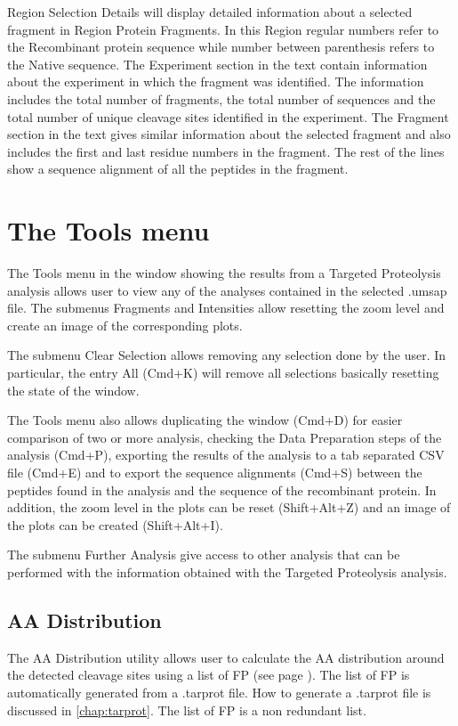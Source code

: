 Region Selection Details will display detailed information about a selected fragment
in Region Protein Fragments. In this Region regular numbers refer to the Recombinant
protein sequence while number between parenthesis refers to the Native sequence.
The Experiment section in the text contain information about the experiment in which
the fragment was identified. The information includes the total number of fragments,
the total number of sequences and the total number of unique cleavage sites identified
in the experiment. The Fragment section in the text gives similar information about
the selected fragment and also includes the first and last residue numbers in the
fragment. The rest of the lines show a sequence alignment of all the peptides in
the fragment.

\section{The Tools menu}

The Tools menu in the window showing the results from a Targeted Proteolysis analysis
allows user to view any of the analyses contained in the selected .umsap file. The
submenus Fragments and Intensities allow resetting the zoom level and create an image
of the corresponding plots.

The submenu Clear Selection allows removing any selection done by the user. In
particular, the entry All (Cmd+K) will remove all selections basically resetting
the state of the window.

The Tools menu also allows duplicating the window (Cmd+D) for easier comparison of
two or more analysis, checking the Data Preparation steps of the analysis (Cmd+P),
exporting the results of the analysis to a tab separated CSV file (Cmd+E) and to
export the sequence alignments (Cmd+S) between the peptides found in the analysis
and the sequence of the recombinant protein. In addition, the zoom level in the plots
can be reset (Shift+Alt+Z) and an image of the plots can be created (Shift+Alt+I).

The submenu Further Analysis give access to other analysis that can be performed
with the information obtained with the Targeted Proteolysis analysis.

\subsection{AA Distribution}
\label{subsec:utilAadistCalc}
The AA Distribution utility allows user to calculate the AA distribution around the detected cleavage sites using a list of FP (see page \pageref{par:tarprotPIP}). The list of FP is automatically generated from a .tarprot file. How to generate a .tarprot file is discussed in \autoref{chap:tarprot}. The list of FP is a non redundant list. 

